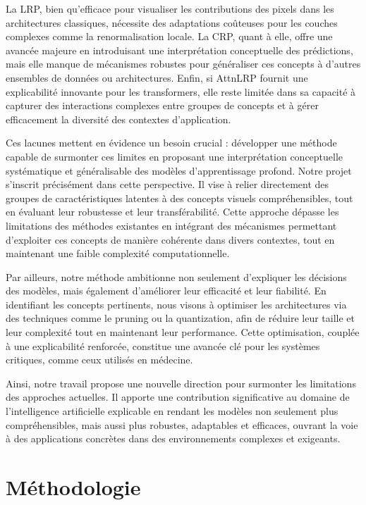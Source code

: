 \documentclass[runningheads]{llncs}
\begin{document}
La LRP, bien qu’efficace pour visualiser les contributions des pixels dans les architectures classiques, nécessite des adaptations coûteuses pour les couches complexes comme la renormalisation locale. La CRP, quant à elle, offre une avancée majeure en introduisant une interprétation conceptuelle des prédictions, mais elle manque de mécanismes robustes pour généraliser ces concepts à d'autres ensembles de données ou architectures. Enfin, si AttnLRP fournit une explicabilité innovante pour les transformers, elle reste limitée dans sa capacité à capturer des interactions complexes entre groupes de concepts et à gérer efficacement la diversité des contextes d’application.

Ces lacunes mettent en évidence un besoin crucial : développer une méthode capable de surmonter ces limites en proposant une interprétation conceptuelle systématique et généralisable des modèles d’apprentissage profond. Notre projet s’inscrit précisément dans cette perspective. Il vise à relier directement des groupes de caractéristiques latentes à des concepts visuels compréhensibles, tout en évaluant leur robustesse et leur transférabilité. Cette approche dépasse les limitations des méthodes existantes en intégrant des mécanismes permettant d’exploiter ces concepts de manière cohérente dans divers contextes, tout en maintenant une faible complexité computationnelle.

Par ailleurs, notre méthode ambitionne non seulement d’expliquer les décisions des modèles, mais également d’améliorer leur efficacité et leur fiabilité. En identifiant les concepts pertinents, nous visons à optimiser les architectures via des techniques comme le pruning ou la quantization, afin de réduire leur taille et leur complexité tout en maintenant leur performance. Cette optimisation, couplée à une explicabilité renforcée, constitue une avancée clé pour les systèmes critiques, comme ceux utilisés en médecine.

Ainsi, notre travail propose une nouvelle direction pour surmonter les limitations des approches actuelles. Il apporte une contribution significative au domaine de l’intelligence artificielle explicable en rendant les modèles non seulement plus compréhensibles, mais aussi plus robustes, adaptables et efficaces, ouvrant la voie à des applications concrètes dans des environnements complexes et exigeants.

\section{Méthodologie}
\end{document}
